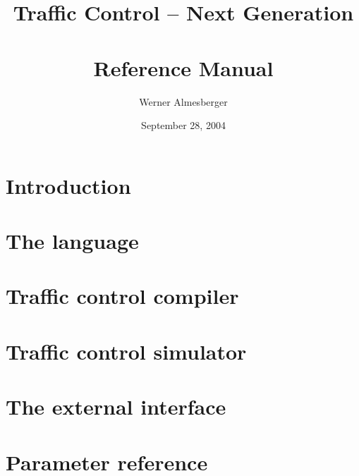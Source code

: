 \documentclass{book}
\begin{document}
\title{Traffic Control -- Next Generation \\
  ~\\
  Reference Manual}
\author{Werner Almesberger}
\date{September 28, 2004}





\chapter{Introduction}
\label{chpintro}



\chapter{The  language}
\label{chptcng}



\chapter{Traffic control compiler}
\label{chptcc}



\chapter{Traffic control simulator}
\label{chptcsim}



\chapter{The external interface}
\label{chpext}



\appendix
\chapter{Parameter reference}
\label{appparam}




\begin{thebibliography}{RFC2698}
\let\mybibitem=\bibitem
\def\bibitem#1{\mybibitem[#1]{#1}}

\end{thebibliography}
\end{document}
